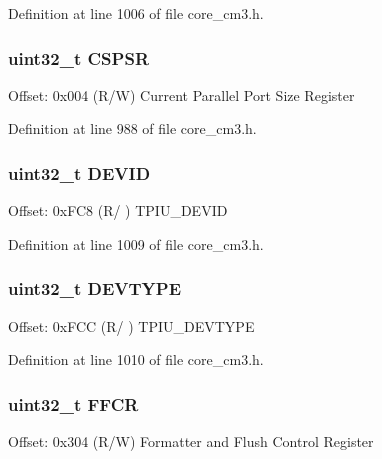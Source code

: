 Definition at line 1006 of file core\+\_\+cm3.\+h.

\subsubsection[{\texorpdfstring{C\+S\+P\+SR}{CSPSR}}]{ uint32\+\_\+t C\+S\+P\+SR}\hypertarget{struct_t_p_i___type_abf4a378b17278d98d2a5f9315fce7a5e}{}\label{struct_t_p_i___type_abf4a378b17278d98d2a5f9315fce7a5e}
Offset\+: 0x004 (R/W) Current Parallel Port Size Register 

Definition at line 988 of file core\+\_\+cm3.\+h.

\subsubsection[{\texorpdfstring{D\+E\+V\+ID}{DEVID}}]{ uint32\+\_\+t D\+E\+V\+ID}\hypertarget{struct_t_p_i___type_aaed316dacef669454fa035e04ee90eca}{}\label{struct_t_p_i___type_aaed316dacef669454fa035e04ee90eca}
Offset\+: 0x\+F\+C8 (R/ ) T\+P\+I\+U\+\_\+\+D\+E\+V\+ID 

Definition at line 1009 of file core\+\_\+cm3.\+h.

\subsubsection[{\texorpdfstring{D\+E\+V\+T\+Y\+PE}{DEVTYPE}}]{ uint32\+\_\+t D\+E\+V\+T\+Y\+PE}\hypertarget{struct_t_p_i___type_a81f643aff0e4bed2638a618e2b1fd3bb}{}\label{struct_t_p_i___type_a81f643aff0e4bed2638a618e2b1fd3bb}
Offset\+: 0x\+F\+CC (R/ ) T\+P\+I\+U\+\_\+\+D\+E\+V\+T\+Y\+PE 

Definition at line 1010 of file core\+\_\+cm3.\+h.

\subsubsection[{\texorpdfstring{F\+F\+CR}{FFCR}}]{ uint32\+\_\+t F\+F\+CR}\hypertarget{struct_t_p_i___type_afe3ca1410c32188d26be24c4ee9e180c}{}\label{struct_t_p_i___type_afe3ca1410c32188d26be24c4ee9e180c}
Offset\+: 0x304 (R/W) Formatter and Flush Control Register 

